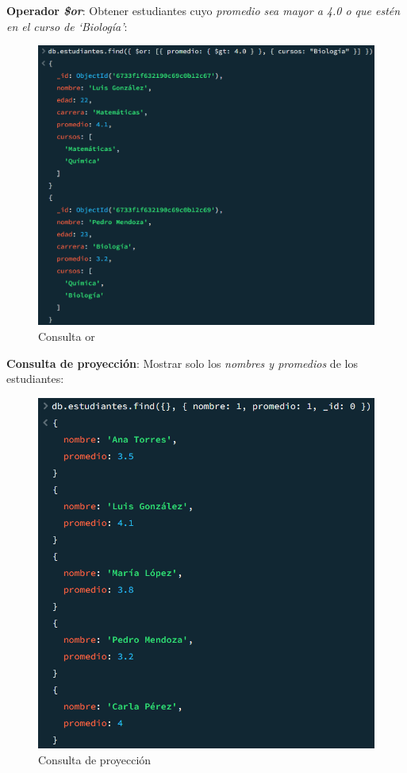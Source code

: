 \textbf{Operador \emph{\$or}}: Obtener estudiantes cuyo \textit{promedio sea mayor a 4.0 o que estén en el curso de `Biología'}:

\begin{figure}[H]
  \centering
  \includegraphics[scale = 0.6]{Imagenes/parte3/3.6.png}
  \caption{Consulta or}
\end{figure}

\textbf{Consulta de proyección}: Mostrar solo los \textit{nombres y promedios} de los estudiantes:

\begin{figure}[H]
  \centering
  \includegraphics[scale = 0.8]{Imagenes/parte3/3.7.png}
  \caption{Consulta de proyección}
\end{figure}